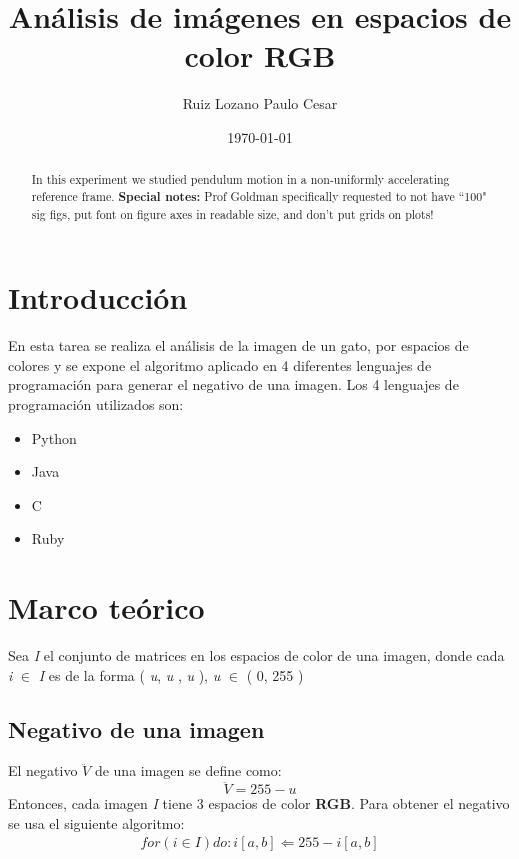 \documentclass[letterpaper,12pt]{article}
\begin{document}
\title{Análisis de imágenes en espacios de color RGB}
\author{Ruiz Lozano Paulo Cesar}
\date{\today}
\maketitle

\begin{abstract}
In this experiment we studied pendulum motion in a non-uniformly accelerating reference frame. \textbf{Special notes:} Prof Goldman specifically requested to not have ``100" sig figs, put font on figure axes in readable size, and don't put grids on plots!
\end{abstract}

\section{Introducción}

En esta tarea se realiza el análisis de la imagen de un gato, por espacios de colores y se expone el algoritmo aplicado en 4 diferentes lenguajes de programación para generar el negativo de una imagen.
Los 4 lenguajes de programación utilizados son:
\begin{itemize}
	\item Python
	\item Java
	\item C
	\item Ruby
\end{itemize}

\section{Marco teórico}

Sea \textit{I} el conjunto de matrices en los espacios de color de una imagen, 
donde cada \textit{i} $\in$  \textit{I} es de la forma ( \textit{u}, \textit{u} , \textit{u} ), \textit{u} $\in$ ( 0, 255 )

\subsection{Negativo de una imagen}
El negativo \textit{$\ddot{V}$} de una imagen se define como:
\begin{equation}
   \ddot{V} = 255 - u
   \label{Eq:equation1} %
\end{equation}
Entonces, cada imagen \textit{I} tiene 3 espacios de color \textbf{RGB}.
Para obtener el negativo se usa el siguiente algoritmo:
\begin{gather*}
for (\textit{i} \in  \textit{I}) do:
	i[a,b] \Longleftarrow 255 - i[a,b]
\end{gather*}
\end{document}
